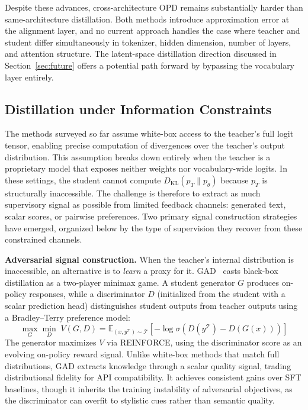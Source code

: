 \documentclass{article} %
\newcommand{\KL}{D_{\mathrm{KL}}}
\newcommand{\ptheta}{p_\theta}
\newcommand{\pteacher}{p_T}
\begin{document}
Despite these advances, cross-architecture OPD remains substantially harder than same-architecture distillation. Both methods introduce approximation error at the alignment layer, and no current approach handles the case where teacher and student differ simultaneously in tokenizer, hidden dimension, number of layers, and attention structure. The latent-space distillation direction discussed in Section~\ref{sec:future} offers a potential path forward by bypassing the vocabulary layer entirely.


\subsection{Distillation under Information Constraints}
\label{subsec:info_constraints}

The methods surveyed so far assume white-box access to the teacher's full logit tensor, enabling precise computation of divergences over the teacher's output distribution. This assumption breaks down entirely when the teacher is a proprietary model that exposes neither weights nor vocabulary-wide logits. In these settings, the student cannot compute $\KL(\pteacher \parallel \ptheta)$ because $\pteacher$ is structurally inaccessible. The challenge is therefore to extract as much supervisory signal as possible from limited feedback channels: generated text, scalar scores, or pairwise preferences. Two primary signal construction strategies have emerged, organized below by the type of supervision they recover from these constrained channels.

\textbf{Adversarial signal construction.}
When the teacher's internal distribution is inaccessible, an alternative is to \emph{learn} a proxy for it. GAD~\citep{2511.10643} casts black-box distillation as a two-player minimax game. A student generator $G$ produces on-policy responses, while a discriminator $D$ (initialized from the student with a scalar prediction head) distinguishes student outputs from teacher outputs using a Bradley--Terry preference model:
\begin{equation}
    \max_{G} \min_{D}\; V(G, D) = \mathbb{E}_{(x, y^{\mathcal{T}}) \sim \mathcal{T}} \left[ -\log \sigma\!\left( D(y^{\mathcal{T}}) - D(G(x)) \right) \right]
\end{equation}
The generator maximizes $V$ via REINFORCE, using the discriminator score as an evolving on-policy reward signal. Unlike white-box methods that match full distributions, GAD extracts knowledge through a scalar quality signal, trading distributional fidelity for API compatibility. It achieves consistent gains over SFT baselines, though it inherits the training instability of adversarial objectives, as the discriminator can overfit to stylistic cues rather than semantic quality.
\end{document}

